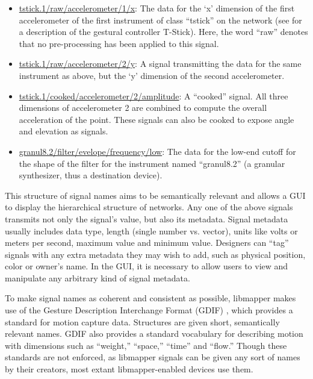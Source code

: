 	\begin{itemize}
	\item\url{tstick.1/raw/accelerometer/1/x}: The data for the `x' dimension of the first accelerometer of the first instrument of class ``tstick'' on the network (see  for a description of the gestural controller T-Stick). Here, the word ``raw'' denotes that no pre-processing has been applied to this signal. 
	\item\url{tstick.1/raw/accelerometer/2/y}: A signal transmitting the data for the same instrument as above, but the `y' dimension of the second accelerometer.
	\item\url{tstick.1/cooked/accelerometer/2/amplitude}: A ``cooked'' signal. All three dimensions of accelerometer 2 are combined to compute the overall acceleration of the point. These signals can also be cooked to expose angle and elevation as signals.
	\item\url{granul8.2/filter/evelope/frequency/low}: The data for the low-end cutoff for the shape of the filter for the instrument named ``granul8.2'' (a granular synthesizer, thus a destination device).
	\end{itemize}

This structure of signal names aims to be semantically relevant and allows a GUI to display the hierarchical structure of networks. Any one of the above signals transmits not only the signal's value, but also its metadata. Signal metadata usually includes data type, length (single number vs. vector), units like volts or meters per second, maximum value and minimum value. Designers can ``tag'' signals with any extra metadata they may wish to add, such as physical position, color or owner's name. In the GUI, it is necessary to allow users to view and manipulate any arbitrary kind of signal metadata.

To make signal names as coherent and consistent as possible, libmapper makes use of the Gesture Description Interchange Format (GDIF) , which provides a standard for motion capture data. Structures are given short, semantically relevant names. GDIF also provides a standard vocabulary for describing motion with dimensions such as ``weight,'' ``space,'' ``time'' and ``flow.'' Though these standards are not enforced, as libmapper signals can be given any sort of names by their creators, most extant libmapper-enabled devices use them.


